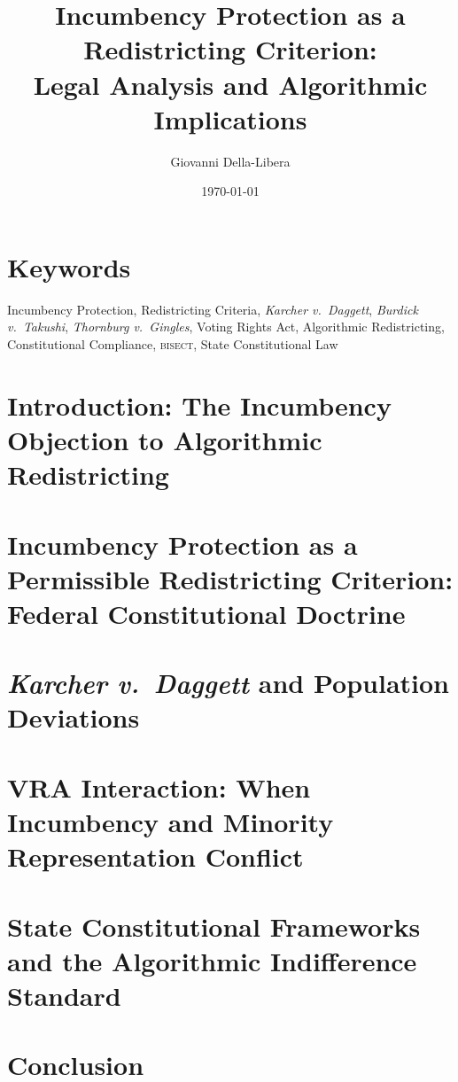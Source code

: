 \documentclass[12pt]{article}
\title{\textbf{Incumbency Protection as a Redistricting Criterion:\\
Legal Analysis and Algorithmic Implications}}
\author{Giovanni Della-Libera}
\date{\today}
\begin{document}
\maketitle

\begin{abstract}

\end{abstract}

\section*{Keywords}
Incumbency Protection, Redistricting Criteria, \textit{Karcher v.\ Daggett},
\textit{Burdick v.\ Takushi}, \textit{Thornburg v.\ Gingles}, Voting Rights Act,
Algorithmic Redistricting, Constitutional Compliance, \textsc{bisect},
State Constitutional Law

\section{Introduction: The Incumbency Objection to Algorithmic Redistricting}


\section{Incumbency Protection as a Permissible Redistricting Criterion:
  Federal Constitutional Doctrine}


\section{\textit{Karcher v.\ Daggett} and Population Deviations}


\section{VRA Interaction: When Incumbency and Minority Representation Conflict}


\section{State Constitutional Frameworks and the Algorithmic Indifference Standard}


\section{Conclusion}




\end{document}
